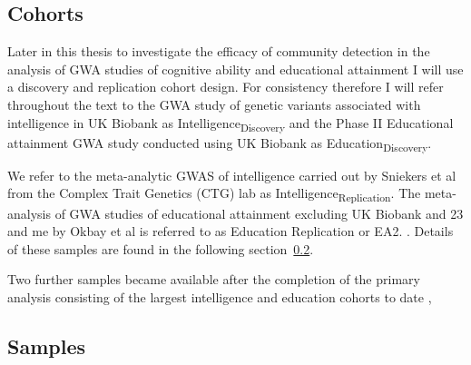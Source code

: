 \subsection{Cohorts}
\label{sec:cohorts from paper section}
Later in this thesis to investigate the efficacy of community detection in the analysis of GWA studies of cognitive ability and educational attainment I will use a discovery and replication cohort design. For consistency therefore I will refer throughout the text to the GWA study of genetic variants associated with intelligence in UK Biobank\cite{bycroft2018uk} as Intelligence\textsubscript{Discovery}  and the Phase II Educational attainment GWA study conducted using UK Biobank as Education\textsubscript{Discovery}.

We refer to the meta-analytic GWAS of intelligence carried out by Sniekers et al from the Complex Trait Genetics (CTG) lab as Intelligence\textsubscript{Replication}. \cite{sniekers2017genome}   The meta-analysis of GWA studies of educational attainment excluding UK Biobank and 23 and me by Okbay et al is referred to as Education Replication or EA2. \cite{okbay2016genome}. Details of these samples are found in the following section~\ref{sec:samples from paper section}. 

Two further samples became available after the completion of the primary analysis consisting of the largest intelligence and education cohorts to date \cite{savage2018genome}, 

\subsection{Samples}
\label{sec:samples from paper section}

